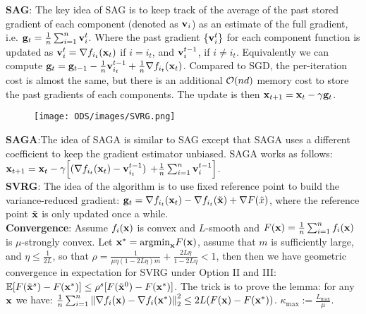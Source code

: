 \textbf{SAG}: The key idea of SAG is to keep track of the average of the past stored gradient of each component (denoted as $\mathbf{v}_i$) as an estimate of the full gradient, i.e. $\mathbf{g}_t = \frac{1}{n}\sum_{i=1}^n{\mathbf{v}_i^t}$. Where the past gradient $\{\mathbf{v}_i^t\}$ for each component function is updated as $\mathbf{v}_i^t = \nabla f_{i_t}(\mathbf{x}_t)$ if $i = i_t$, and $\mathbf{v}_i^{t-1}$, if $i \neq i_t$. Equivalently we can compute $\mathbf{g}_t = \mathbf{g}_{t-1} - \frac{1}{n}\mathbf{v}_{i_t}^{t-1} + \frac{1}{n} \nabla f_{i_t}(\mathbf{x}_t)$. Compared to SGD, the per-iteration cost is almost the same, but there is an additional $\mathcal{O}(n d)$ memory cost to store the past gradients of each components. The update is then $\mathbf{x}_{t+1} = \mathbf{x}_t - \gamma \mathbf{g}_t$. \\
\begin{wrapfigure}[13]{l}{0.15\textwidth}
    \texttt{[image: ODS/images/SVRG.png]}
\end{wrapfigure}
\textbf{SAGA}:The idea of SAGA is similar to SAG except that SAGA uses a different coefficient to keep the gradient estimator unbiased. SAGA works as follows: $\mathbf{x}_{t+1} = \mathbf{x}_t - \gamma\Big[(\nabla f_{i_t}(\mathbf{x}_t) - \mathbf{v}_{i_t}^{t-1})$ $  +\frac{1}{n}\sum_{i=1}^n{\mathbf{v}_i^{t-1}} \Big]$. \\
\textbf{SVRG}: The idea of the algorithm is to use fixed reference point to build the variance-reduced gradient: $\mathbf{g}_t = \nabla f_{i_t}(\mathbf{x}_t) - \nabla f_{i_t}(\Tilde{\mathbf{x}}) + \nabla F(\Tilde{x})$, where the reference point $\Tilde{\mathbf{x}}$ is only updated once a while. \\
\textbf{Convergence}: Assume $f_i(\mathbf{x})$ is convex and $L$-smooth and $F(\mathbf{x})= \frac{1}{n}\sum_{i=1}^n{f_i(\mathbf{x})}$ is $\mu$-strongly convex. Let $\mathbf{x}^* = \mathrm{argmin}_{\mathbf{x}}{F(\mathbf{x})}$, assume that $m$ is sufficiently large, and $\eta \leq \frac{1}{2L}$, so that $\rho = \frac{1}{\mu \eta (1 - 2L\eta) m} + \frac{2L \eta}{1 - 2L\eta} < 1$, then then we have geometric convergence in expectation for SVRG under Option II and III: $\mathbb{E}[F(\Tilde{\mathbf{x}}^s) - F(\mathbf{x}^*)] \leq \rho^s [F(\Tilde{\mathbf{x}}^0) - F(\mathbf{x}^*)]$. The trick is to prove the lemma: for any $\mathbf{x}$ we have: $\frac{1}{n}\sum_{i=1}^n{\norm{\nabla f_i(\mathbf{x}) - \nabla f_i(\mathbf{x}^*)}_2^2} \leq 2L(F(\mathbf{x}) - F(\mathbf{x}^*))$. $\kappa_{\max} := \frac{L_{\max}}{\mu}$. \\
